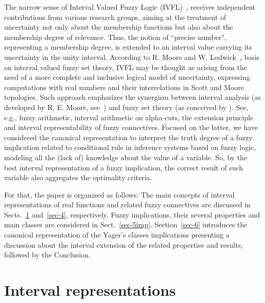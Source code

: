 \documentclass[conference]{IEEEtran}
\theoremstyle{plain}
\theoremstyle{remark}
\theoremstyle{definition}
\theoremstyle{proposition}
\begin{document}
The narrow sense of Interval Valued Fuzzy Logic (IVFL)~\cite{Zad75}, receives independent contributions from various research groups, aiming at the treatment of uncertainty not only about the membership functions but also about the membership degree of relevance. Thus, the notion of ``precise number", representing a membership degree, is extended to an interval value carrying its uncertainty in the unity interval.
According to R. Moore and W. Lodwick~\cite{Lod02}, basis on interval valued fuzzy set theory, IVFL may be thought
as arising from the need of a more complete and inclusive logical model of uncertainty, expressing computations with real numbers and their interrelations in Scott and Moore topologies. Such approach emphasizes the synergism between interval analysis (as developed by R. E. Moore, see~\cite{Moo79, Moo03,keafort}) and fuzzy set theory (as conceived by \cite{Zad65}). See, e.g., fuzzy arithmetic, interval arithmetic on alpha-cuts, the extension principle and interval representability of fuzzy connectives. Focused on the latter, we have considered the canonical representation to interpret the truth degree of a fuzzy implication related to conditional rule in inference systems based on fuzzy logic, modeling all the (lack of) knowledge about the value of a variable. So, by the best interval representation of a fuzzy implication, the correct result of such variable also aggregates the optimality criteria\cite{Hic01}.



For that, the paper is organized as follows: The main concepts of interval representations of real functions and related fuzzy connectives are discussed in Sects.~\ref{sec-3} and~\ref{sec-4}, respectively. Fuzzy implications, their several properties and main classes are considered in Sect.~\ref{sec-5imp}. Section~\ref{sec-6} introduces the canonical representation of the Yager's classes implications presenting a discussion about the interval extension of the related properties and results, followed by the Conclusion.

\section{Interval representations}\label{sec-3}

%
\end{document}
